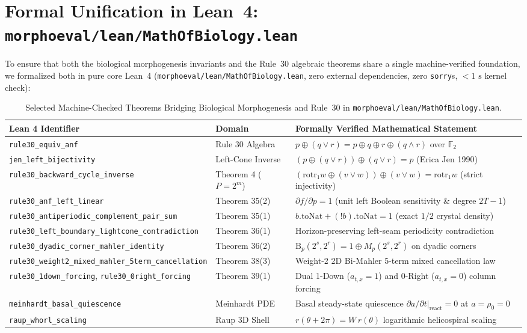 \documentclass[11pt,a4paper]{article}
\theoremstyle{definition}
\theoremstyle{remark}
\newcommand{\Ftwo}{\mathbb{F}_2}
\newcommand{\rotr}{\mathrm{rotr}}
\begin{document}
\section{Formal Unification in Lean~4: \texttt{morphoeval/lean/MathOfBiology.lean}}

To ensure that both the biological morphogenesis invariants and the Rule~30 algebraic theorems share a single machine-verified foundation, we formalized both in pure core Lean~4 (\texttt{morphoeval/lean/MathOfBiology.lean}, zero external dependencies, zero \texttt{sorry}s, $<1\text{ s}$ kernel check):

\begin{table}[htbp]
\centering
\caption{Selected Machine-Checked Theorems Bridging Biological Morphogenesis and Rule~30 in \texttt{morphoeval/lean/MathOfBiology.lean}.}
\label{tab:lean}
\footnotesize
\begin{tabular}{@{}llp{}@{}}
\toprule
\textbf{Lean 4 Identifier} & \textbf{Domain} & \textbf{Formally Verified Mathematical Statement} \\
\midrule
\texttt{rule30\_equiv\_anf} & Rule 30 Algebra & $p \oplus (q \lor r) = p \oplus q \oplus r \oplus (q \land r)$ over $\Ftwo$ \\
\texttt{jen\_left\_bijectivity} & Left-Cone Inverse & $(p \oplus (q \lor r)) \oplus (q \lor r) = p$ (Erica Jen 1990) \\
\texttt{rule30\_backward\_cycle\_inverse} & Theorem 4 ($P=2^m$) & $(\rotr_1 w \oplus (v \lor w)) \oplus (v \lor w) = \rotr_1 w$ (strict injectivity) \\
\texttt{rule30\_anf\_left\_linear} & Theorem 35(2) & $\partial f/\partial p = 1$ (unit left Boolean sensitivity \& degree $2T-1$) \\
\texttt{rule30\_antiperiodic\_complement\_pair\_sum} & Theorem 35(1) & $b.\mathrm{toNat} + (!b).\mathrm{toNat} = 1$ (exact $1/2$ crystal density) \\
\texttt{rule30\_left\_boundary\_lightcone\_contradiction} & Theorem 36(1) & Horizon-preserving left-seam periodicity contradiction \\
\texttt{rule30\_dyadic\_corner\_mahler\_identity} & Theorem 36(2) & $\mathrm{B}_p(2^s, 2^r) = 1 \oplus M_p(2^s, 2^r)$ on dyadic corners \\
\texttt{rule30\_weight2\_mixed\_mahler\_5term\_cancellation} & Theorem 38(3) & Weight-2 2D Bi-Mahler 5-term mixed cancellation law \\
\texttt{rule30\_1down\_forcing}, \texttt{rule30\_0right\_forcing} & Theorem 39(1) & Dual 1-Down ($a_{t,x}=1$) and 0-Right ($a_{t,x}=0$) column forcing \\
\texttt{meinhardt\_basal\_quiescence} & Meinhardt PDE & Basal steady-state quiescence $\partial a/\partial t|_{\mathrm{react}} = 0$ at $a=\rho_0=0$ \\
\texttt{raup\_whorl\_scaling} & Raup 3D Shell & $r(\theta + 2\pi) = W\,r(\theta)$ logarithmic helicospiral scaling \\
\bottomrule
\end{tabular}
\end{table}
\end{document}
